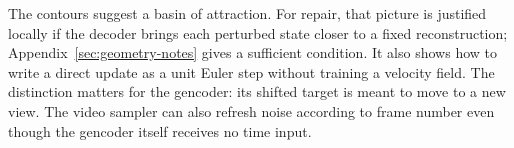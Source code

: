 The contours suggest a basin of attraction. For repair, that picture is justified locally if the decoder brings each perturbed state closer to a fixed reconstruction; Appendix~\ref{sec:geometry-notes} gives a sufficient condition. It also shows how to write a direct update as a unit Euler step without training a velocity field. The distinction matters for the gencoder: its shifted target is meant to move to a new view. The video sampler can also refresh noise according to frame number even though the gencoder itself receives no time input.
